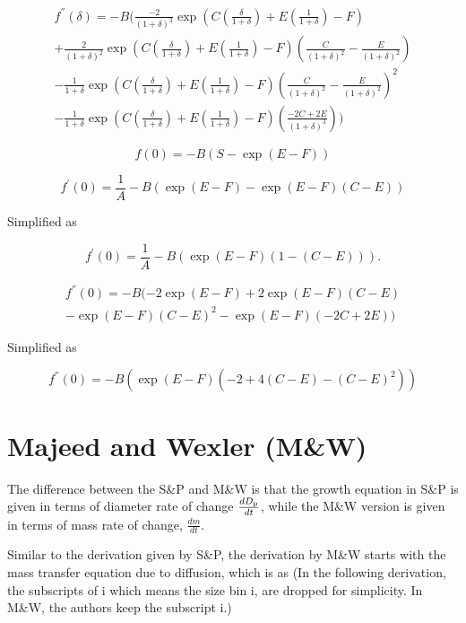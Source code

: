 \documentclass[12pt]{article}
\begin{document}
\begin{eqnarray}\label{eqn:33}
f^{''}(\delta)=-B(\frac{-2}{(1+\delta)^{3}}\exp(C (\frac{\delta}{1+\delta})+E(\frac{1}{1+\delta})-F) \\ \nonumber
+\frac{2}{(1+\delta)^{2}}\exp(C (\frac{\delta}{1+\delta})+E(\frac{1}{1+\delta})-F)(\frac{C}{(1+\delta)^{2}}-\frac{E}{(1+\delta)^{2}}) \\ \nonumber
-\frac{1}{1+\delta}\exp(C (\frac{\delta}{1+\delta})+E(\frac{1}{1+\delta})-F)(\frac{C}{(1+\delta)^{2}}-\frac{E}{(1+\delta)^{2}})^{2} \\ \nonumber
-\frac{1}{1+\delta}\exp(C (\frac{\delta}{1+\delta})+E(\frac{1}{1+\delta})-F)(\frac{-2C+2E}{(1+\delta)^{3}}))
\end{eqnarray}


\begin{equation}\label{eqn:34}
f(0)=-B(S-\exp(E-F))
\end{equation}

\begin{equation}\label{eqn:35}
f^{'}(0)=\frac{1}{A}-B(\exp(E-F)-\exp(E-F)(C-E))
\end{equation}

Simplified as 

\begin{equation}\label{eqn:36}
f^{'}(0)=\frac{1}{A}-B(\exp(E-F)(1-(C-E))).
\end{equation}

\begin{eqnarray}\label{eqn:37}
f^{''}(0)=-B(-2\exp(E-F)+2\exp(E-F)(C-E) \\ \nonumber
-\exp(E-F)(C-E)^{2}-\exp(E-F)(-2C+2E))
\end{eqnarray}

Simplified as 

\begin{equation}\label{eqn:38}
f^{''}(0)=-B(\exp(E-F)(-2+4(C-E)-(C-E)^2))
\end{equation}


\section{Majeed and Wexler (M\&W) }

The difference between the S\&P and M\&W is that the growth equation in S\&P is given in terms of diameter rate of change $\frac{d D_{\rm p}}{dt}$, while the M\&W version is given in terms of mass rate of change, $\frac{dm}{dt}$.

Similar to the derivation given by S\&P, the derivation by M\&W starts with the mass transfer equation due to diffusion, which is as  (In the following derivation, the subscripts of i which means the size bin i,  are dropped for simplicity. In M\&W, the authors keep the subscript i.)
\end{document}
